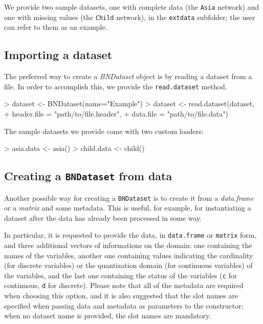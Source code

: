 \documentclass{article}
\newcommand{\Robject}[1]{{\texttt{#1}}}
\newcommand{\Rmethod}[1]{{\texttt{#1}}}
\newcommand{\Rclass}[1]{{\textit{#1}}}
\begin{document}
We provide two sample datasets, one with complete data (the \texttt{Asia} network) and one with missing values
(the \texttt{Child} network), in the \texttt{extdata} subfolder;
the user can refer to them as an example.

\subsection{Importing a dataset}
The preferred way to create a \Rclass{BNDataset} object is by reading a dataset from a file.
In order to accomplish this, we provide the \Rmethod{read.dataset} method.

\begin{Schunk}
\begin{Sinput}
> dataset <- BNDataset(name="Example")
> dataset <- read.dataset(dataset,
+                         header.file = "path/to/file.header",
+                         data.file   = "path/to/file.data")
\end{Sinput}
\end{Schunk}

The sample datasets we provide come with two custom loaders:
\begin{Schunk}
\begin{Sinput}
> asia.data  <- asia()
> child.data <- child()
\end{Sinput}
\end{Schunk}

\subsection{Creating a \Robject{BNDataset} from data}
Another possible way for creating a \Robject{BNDataset} is to create it from a \Rclass{data.frame} or a \Rclass{matrix}
and some metadata. This is useful, for example, for instantiating a dataset after the data has already been 
processed in some way.

In particular, it is requested to provide the data, in \texttt{data.frame} or \texttt{matrix} form, and three additional
vectors of informations on the domain: one containing the names of the variables, another one containing values indicating
the cardinality (for discrete variables) or the quantization domain (for continuous variables) of the variables,
and the last one containing the status of the variables (\texttt{c} for continuous, \texttt{d} for discrete). Please note that
all of the metadata are required when choosing this option, and it is also suggested that the slot names
are specified when passing data and metadata as parameters to the constructor;
when no dataset name is provided, the slot names are mandatory.
\end{document}
